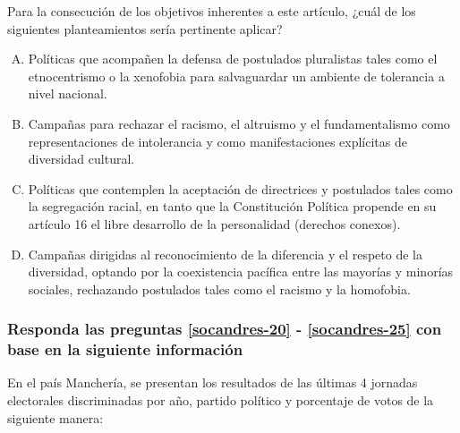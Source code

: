 \begin{enumerate}
Para la consecución de los objetivos inherentes a este artículo, ¿cuál de los siguientes planteamientos sería pertinente aplicar?


\begin{enumerate}[(A)]
\item Políticas que acompañen la defensa de postulados pluralistas tales como el etnocentrismo o la xenofobia para salvaguardar un ambiente de tolerancia a nivel nacional.
\item Campañas para rechazar el racismo, el altruismo y el fundamentalismo como representaciones de intolerancia y como manifestaciones explícitas de diversidad cultural.
\item Políticas que contemplen la aceptación de directrices y postulados tales como la segregación racial, en tanto que la Constitución Política propende en su artículo 16 el libre desarrollo de la personalidad (derechos conexos).
\item Campañas dirigidas al reconocimiento de la diferencia y el respeto de la diversidad, optando por la coexistencia pacífica entre las mayorías y minorías sociales, rechazando postulados tales como el racismo y la homofobia. 
\end{enumerate}

\subsubsection*{Responda las preguntas \ref{socandres-20} - \ref{socandres-25} con base en la siguiente información}

En el país Manchería, se presentan los resultados de las últimas 4 jornadas electorales discriminadas por año, partido político y porcentaje de votos de la siguiente manera: 


\end{enumerate}
